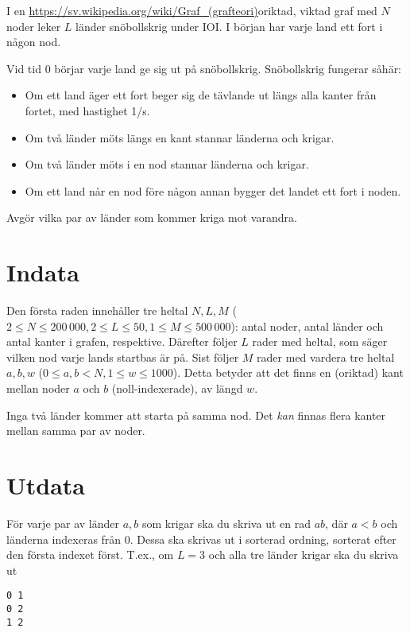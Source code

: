 
I en \url{https://sv.wikipedia.org/wiki/Graf_(grafteori)}{oriktad, viktad graf}
med $N$ noder leker $L$ länder snöbollskrig under IOI.
I början har varje land ett fort i någon nod.

Vid tid $0$ börjar varje land ge sig ut på snöbollskrig. Snöbollskrig fungerar såhär:

\begin{itemize}
\item Om ett land äger ett fort beger sig de tävlande ut längs alla kanter från fortet, med hastighet 1/s.
\item Om två länder möts längs en kant stannar länderna och krigar.
\item Om två länder möts i en nod stannar länderna och krigar.
\item Om ett land når en nod före någon annan bygger det landet ett fort i noden.
\end{itemize}

Avgör vilka par av länder som kommer kriga mot varandra.

\section*{Indata}

Den första raden innehåller tre heltal $N,L,M$ ($2 \le N \le 200\,000, 2 \le L \le 50, 1 \le M \le 500\,000$):
antal noder, antal länder och antal kanter i grafen, respektive.
Därefter följer $L$ rader med heltal, som säger vilken nod varje lands startbas är på.
Sist följer $M$ rader med vardera tre heltal $a, b, w$ ($0 \le a,b < N, 1 \le w \le 1000$).
Detta betyder att det finns en (oriktad) kant mellan noder $a$ och $b$ (noll-indexerade), av längd $w$.

Inga två länder kommer att starta på samma nod. Det \emph{kan} finnas flera kanter mellan samma par av noder.

\section*{Utdata}

För varje par av länder $a, b$ som krigar ska du skriva ut en rad $a b$, där $a < b$ och länderna indexeras från $0$.
Dessa ska skrivas ut i sorterad ordning, sorterat efter den första indexet först.
T.ex., om $L = 3$ och alla tre länder krigar ska du skriva ut
\begin{lstlisting}
0 1
0 2
1 2
\end{lstlisting}

